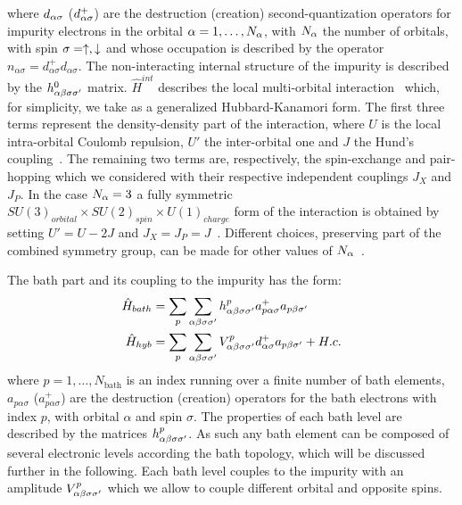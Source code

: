 \documentclass[edipack2.tex]{subfiles}
\begin{document}
where $d_{\alpha\sigma}$ ($d^+_{\alpha\sigma}$) are the destruction (creation)
second-quantization operators for impurity electrons in the
orbital $\alpha=1,\dots,N_\alpha$, with $N_\alpha$ the number of orbitals,
with spin $\sigma=\uparrow,\downarrow$ and whose occupation is described
by the  operator  
$n_{\alpha\sigma}=d^{+}_{\alpha\sigma}d_{\alpha\sigma}$. 
The non-interacting internal structure of the impurity is described by
the $h^{0}_{\alpha\beta\sigma\sigma'}$ matrix. 
$\hat{H}^{int}$ describes the  local multi-orbital
interaction~\cite{Georges2013ACMP} which, for simplicity, we take as a
generalized Hubbard-Kanamori form.  
The first three terms represent the density-density part of the
interaction, where $U$ is the local intra-orbital Coulomb repulsion,
$U'$ the inter-orbital one and $J$ the Hund's coupling~\cite{Georges2013ACMP}.  
The  remaining two terms are, respectively, the spin-exchange and
pair-hopping which we considered with their respective independent
couplings $J_X$ and $J_P$.
In the case $N_\alpha=3$ a fully symmetric $SU(3)_{orbital}\times SU(2)_{spin}\times
U(1)_{charge}$ form of the interaction is obtained by setting $U'=U-2J$ and
$J_X=J_P=J$~\cite{Georges2013ACMP}. Different choices, preserving part
of the combined symmetry group, can be made for other values of
$N_\alpha$~\cite{Georges2013ACMP}. 


The bath part and its coupling to the impurity has the form: 
\begin{equation}\label{Hbath}
  \begin{split}
    \hat{H}_{bath} &=
    \sum_p\sum_{\alpha\beta\sigma\sigma'}h^p_{\alpha\beta\sigma\sigma'}a^{+}_{p\alpha\sigma}a_{p\beta\sigma'}\\
    \hat{H}_{hyb} &= \sum_p\sum_{\alpha\beta\sigma\sigma'}V^p_{\alpha\beta\sigma\sigma'}d^{+}_{\alpha\sigma}a_{p\beta\sigma'}+H.c. \\
\end{split}
\end{equation}
where $p=1,\dots,N_\mathrm{bath}$ is an index running over a finite number of
bath elements, $a_{p\alpha\sigma}$ ($a^+_{p\alpha\sigma}$) are the destruction (creation) operators for
the bath electrons with index $p$, with orbital $\alpha$ and
spin $\sigma$.
The  properties of each bath level are described by the
matrices $h^p_{\alpha\beta\sigma\sigma'}$. As such any bath element can be
composed of several electronic levels according the bath topology,
which will be discussed further in the following.
Each bath level couples to the impurity with an amplitude
$V^p_{\alpha\beta\sigma\sigma'}$ which we allow to couple different orbital and
opposite spins.   
\end{document}
